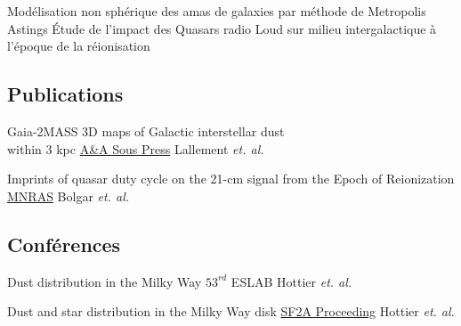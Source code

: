 \documentclass[
a4paper, 
]{fortysecondscv}
\begin{document}
\makefrontsidebar

\begin{cvtable}
  {Modélisation non sphérique des amas de galaxies par méthode de Metropolis Astings}
  {Étude de l'impact des Quasars radio Loud sur milieu intergalactique à l'époque de la
  réionisation}
\end{cvtable}


\begin{cvtable}
\end{cvtable}

\subsection{Publications}
\begin{cvtable}
  {Gaia-2MASS 3D maps of Galactic interstellar dust\\within 3 kpc}
  {\href{https://ui.adsabs.harvard.edu/\#abs/2019arXiv190204116L/abstract}{A\&A Sous Press}}
  {Lallement \textit{et. al.}}

  {Imprints of quasar duty cycle on the 21-cm signal from the Epoch of Reionization}
  {\href{https://ui.adsabs.harvard.edu/\#abs/2019arXiv190204116L/abstract}{MNRAS}}
  {Bolgar \textit{et. al.}}
\end{cvtable}

\subsection{Conférences}
\begin{cvtable}
  {Dust distribution in the Milky Way}
  {$53^{rd}$ ESLAB}
  {Hottier \textit{et. al.}}

  {Dust and star distribution in the Milky Way disk}
  {\href{https://ui.adsabs.harvard.edu/\#abs/2018sf2a.conf..345H/abstract}{SF2A Proceeding}}
  {Hottier \textit{et. al.}}
\end{cvtable}
\end{document}
